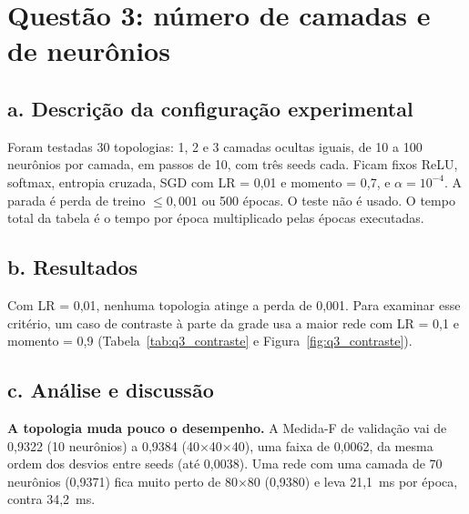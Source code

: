 \section{Questão 3: número de camadas e de neurônios}

\subsection*{a. Descrição da configuração experimental}

Foram testadas 30 topologias: 1, 2 e 3 camadas ocultas iguais, de 10 a 100 neurônios por camada, em passos de 10, com três seeds cada.
Ficam fixos ReLU, softmax, entropia cruzada, SGD com LR = 0,01 e momento = 0,7, e $\alpha = 10^{-4}$. A parada é perda de treino
$\le 0{,}001$ ou 500 épocas. O teste não é usado. O tempo total da tabela é o tempo por época multiplicado pelas épocas executadas.

\subsection*{b. Resultados}


Com LR = 0,01, nenhuma topologia atinge a perda de 0,001. Para examinar esse critério, um caso de contraste à parte da grade usa
a maior rede com LR = 0,1 e momento = 0,9 (Tabela~\ref{tab:q3_contraste} e Figura~\ref{fig:q3_contraste}).


\subsection*{c. Análise e discussão}

\textbf{A topologia muda pouco o desempenho.} A Medida-F de validação vai de 0,9322 (10 neurônios) a 0,9384 (40$\times$40$\times$40), uma faixa de 0,0062,
da mesma ordem dos desvios entre seeds (até 0,0038). Uma rede com uma camada de 70 neurônios (0,9371) fica muito perto de
80$\times$80 (0,9380) e leva 21,1~ms por época, contra 34,2~ms.


